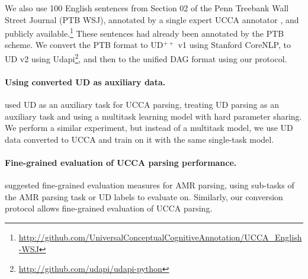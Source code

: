 \documentclass[11pt,a4paper]{article}
\begin{document}
We also use 100 English sentences from Section 02 of the Penn Treebank Wall Street Journal
(PTB WSJ),
annotated by a single expert UCCA annotator \cite{hershcovich2018multitask},
and publicly available.\footnote{\url{http://github.com/UniversalConceptualCognitiveAnnotation/UCCA_English-WSJ}}
These sentences had already been annotated by the PTB scheme.
We convert the PTB format to UD$^{++}$ v1 using Stanford CoreNLP,
to UD v2 using Udapi\footnote{\url{http://github.com/udapi/udapi-python}},
and then to the unified DAG format using our protocol.

\paragraph{Using converted UD as auxiliary data.}

\citet{hershcovich2018multitask} used UD as an auxiliary task for UCCA parsing,
treating UD parsing as an auxiliary task and using a multitask learning model
with hard parameter sharing.
We perform a similar experiment, but instead of a multitask model,
we use UD data converted to UCCA and train on it with the same single-task model.

\paragraph{Fine-grained evaluation of UCCA parsing performance.}

\citet{damonte-17,szubert2018structured} suggested fine-grained evaluation measures
for AMR parsing, using sub-tasks of the AMR parsing task or UD labels to evaluate on.
Similarly, our conversion protocol allows fine-grained evaluation of UCCA parsing.



%
%
%
%
%
%
%
%




\end{document}
